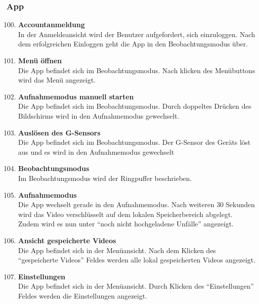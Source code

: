 \subsubsection{App}
\begin{enumerate}[\bfseries{T}10]  
\setcounter{enumi}{99}{}

\item \textbf{Accountanmeldung} \hfill\\  
In der Anmeldeansicht wird der Benutzer aufgefordert, sich einzuloggen. Nach dem erfolgreichen Einloggen geht die App in den Beobachtungsmodus \"uber. 

\item \textbf{Men\"u \"offnen} \hfill\\
Die App befindet sich im Beobachtungsmodus. Nach klicken des Men\"ubuttons wird das Men\"u angezeigt.

\item \textbf{Aufnahmemodus manuell starten} \hfill\\
Die App befindet sich im Beobachtungsmodus. Durch doppeltes Dr\"ucken des Bildschirms wird in den Aufnahmemodus gewechselt. 

\item \textbf{Ausl\"osen des G-Sensors} \hfill\\  
Die App befindet sich im Beobachtungsmodus. Der G-Sensor des Ger\"ats l\"ost aus und es wird in den Aufnahmemodus gewechselt

\item \textbf{Beobachtungsmodus} \hfill\\
Im Beobachtungsmodus wird der Ringpuffer beschrieben.

\item \textbf{Aufnahmemodus} \hfill\\  
Die App wechselt gerade in den Aufnahmemodus. Nach weiteren 30 Sekunden wird das Video verschl\"usselt auf dem lokalen Speicherbereich abgelegt. Zudem wird es nun unter ``noch nicht hochgeladene Unf\"alle'' angezeigt. 

\item \textbf{Ansicht gespeicherte Videos} \hfill\\
Die App befindet sich in der Men\"uansicht. Nach dem Klicken des ``gespeicherte Videos'' Feldes werden alle lokal gespeicherten Videos angezeigt.

\item \textbf{Einstellungen} \hfill\\
Die App befindet sich in der Men\"uansicht. Durch Klicken des ``Einstellungen'' Feldes werden die Einstellungen angezeigt.


\end{enumerate}
